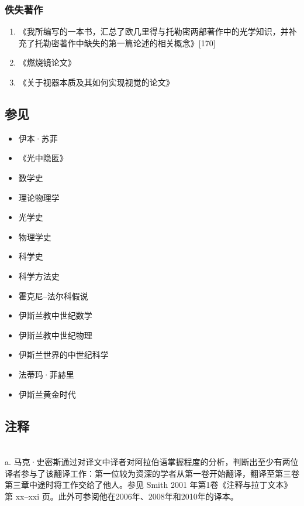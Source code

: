 \subsubsection{佚失著作}
\begin{enumerate}
\item 《我所编写的一本书，汇总了欧几里得与托勒密两部著作中的光学知识，并补充了托勒密著作中缺失的第一篇论述的相关概念》[170]
\item 《燃烧镜论文》
\item 《关于视器本质及其如何实现视觉的论文》
\end{enumerate}
\subsection{参见}
\begin{itemize}
\item 伊本·苏菲
\item 《光中隐匿》
\item 数学史
\item 理论物理学
\item 光学史
\item 物理学史
\item 科学史
\item 科学方法史
\item 霍克尼–法尔科假说
\item 伊斯兰教中世纪数学
\item 伊斯兰教中世纪物理
\item 伊斯兰世界的中世纪科学
\item 法蒂玛·菲赫里
\item 伊斯兰黄金时代
\end{itemize}
\subsection{注释}\\
a. 马克·史密斯通过对译文中译者对阿拉伯语掌握程度的分析，判断出至少有两位译者参与了该翻译工作：第一位较为资深的学者从第一卷开始翻译，翻译至第三卷第三章中途时将工作交给了他人。参见 Smith 2001 年第1卷《注释与拉丁文本》第 xx–xxi 页。此外可参阅他在2006年、2008年和2010年的译本。
